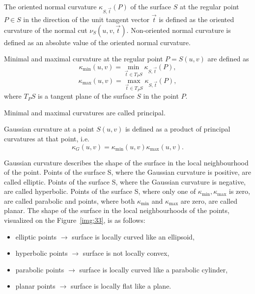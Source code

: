 \begin{definition}
    The oriented normal curvature $\kappa_{S, \vec{t}}(P)$ of the surface $S$ at the 
    regular point $P \in S$ in the direction of the unit tangent vector
    $\vec{t}$ is defined as the oriented curvature of the normal cut $\nu_S(u, v, \vec{t})$.
    Non-oriented normal curvature is defined as an absolute value of the oriented normal curvature.
\end{definition}

\begin{definition}
    Minimal and maximal curvature at the regular point $P = S(u,v)$ are defined as
    $$\kappa_{\min}(u,v) = \min_{\vec{t} \in T_PS} \kappa_{S, \vec{t}}(P),$$
    $$\kappa_{\max}(u,v) = \max_{\vec{t} \in T_PS} \kappa_{S, \vec{t}}(P),$$
    where $T_PS$ is a tangent plane of the surface $S$ in the point $P$.

    Minimal and maximal curvatures are called principal.
\end{definition}

\begin{definition}
    Gaussian curvature at a point $S(u, v)$ is defined as a product of principal curvatures
    at that point, i.e.
    $$\kappa_G(u, v) = \kappa_{\min}(u,v) \kappa_{\max}(u,v).$$
\end{definition}

Gaussian curvature describes the shape of the surface in the local neighbourhood of the point.
Points of the surface S, where the Gaussian curvature is positive, are called elliptic.
Points of the surface S, where the Gaussian curvature is negative, are called hyperbolic.
Points of the surface S, where only one of $\kappa_{\min}, \kappa_{\max}$ is zero, are called
parabolic and points, where both $\kappa_{\min}$ and $\kappa_{\max}$ are zero, are called planar.
The shape of the surface in the local neighbourhoods of the points, visualized on the
Figure~\ref{img:33}, is as follows:
\begin{itemize}
    \item {elliptic points $\longrightarrow$ surface is locally curved like an ellipsoid,}
    \item {hyperbolic points $\longrightarrow$ surface is not locally convex,}
    \item {parabolic points $\longrightarrow$ surface is locally curved like a parabolic cylinder,}
    \item {planar points $\longrightarrow$ surface is locally flat like a plane.}
\end{itemize}

